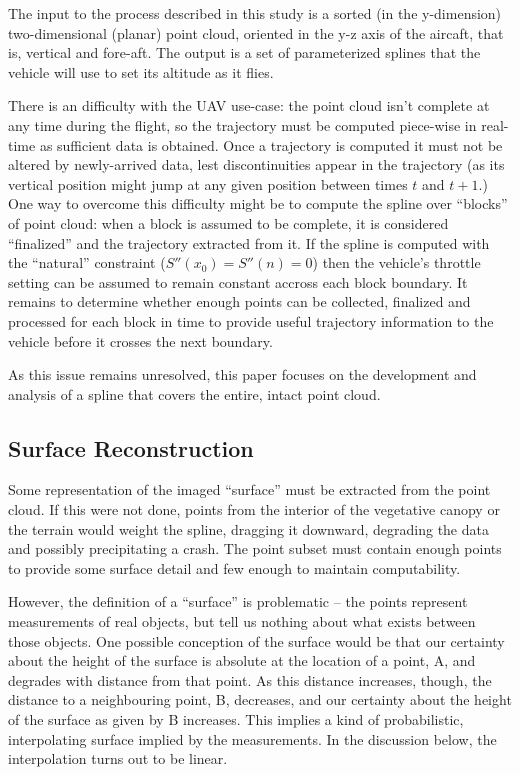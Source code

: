 \documentclass[doc]{apa6}
\begin{document}
The input to the process described in this study is a sorted (in the y-dimension) two-dimensional (planar) point cloud, oriented in the y-z axis of the aircaft, that is, vertical and fore-aft. The output is a set of parameterized splines that the vehicle will use to set its altitude as it flies.

There is an difficulty with the UAV use-case: the point cloud isn't complete at any time during the flight, so the trajectory must be computed piece-wise in real-time as sufficient data is obtained. Once a trajectory is computed it must not be altered by newly-arrived data, lest discontinuities appear in the trajectory (as its vertical position might jump at any given position between times $t$ and $t+1$.) One way to overcome this difficulty might be to compute the spline over ``blocks'' of point cloud: when a block is assumed to be complete, it is considered ``finalized'' and the trajectory extracted from it. If the spline is computed with the ``natural'' constraint ($S''(x_0) = S''(n) = 0$) then the vehicle's throttle setting can be assumed to remain constant accross each block boundary. It remains to determine whether enough points can be collected, finalized and processed for each block in time to provide useful trajectory information to the vehicle before it crosses the next boundary.

As this issue remains unresolved, this paper focuses on the development and analysis of a spline that covers the entire, intact point cloud.


\subsection{Surface Reconstruction}

Some representation of the imaged ``surface'' must be extracted from the point cloud. If this were not done, points from the interior of the vegetative canopy or the terrain would weight the spline, dragging it downward, degrading the data and possibly precipitating a crash. The point subset must contain enough points to provide some surface detail and few enough to maintain computability. 

However, the definition of a ``surface'' is problematic -- the points represent measurements of real objects, but tell us nothing about what exists between those objects. One possible conception of the surface would be that our certainty about the height of the surface is absolute at the location of a point, A, and degrades with distance from that point. As this distance increases, though, the distance to a neighbouring point, B, decreases, and our certainty about the height of the surface as given by B increases. This implies a kind of probabilistic, interpolating surface implied by the measurements. In the discussion below, the interpolation turns out to be linear.
\end{document}
